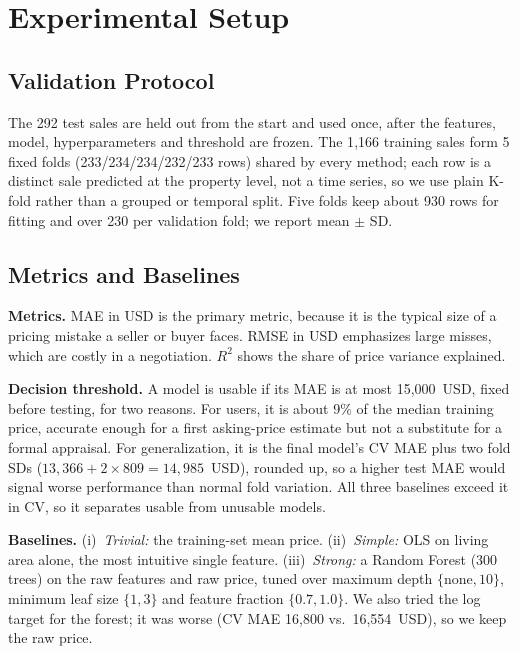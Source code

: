 \section{Experimental Setup}
\label{sec:setup}

\subsection{Validation Protocol}
The 292 test sales are held out from the start and used once, after the features, model, hyperparameters and threshold are frozen.
The 1{,}166 training sales form 5 fixed folds (233/234/234/232/233 rows) shared by every method; each row is a distinct sale predicted at the property level, not a time series, so we use plain K-fold rather than a grouped or temporal split.
Five folds keep about 930 rows for fitting and over 230 per validation fold; we report mean $\pm$ SD.

\subsection{Metrics and Baselines}
\textbf{Metrics.} MAE in USD is the primary metric, because it is the typical size of a pricing mistake a seller or buyer faces.
RMSE in USD emphasizes large misses, which are costly in a negotiation.
$R^2$ shows the share of price variance explained.

\textbf{Decision threshold.} A model is usable if its MAE is at most 15{,}000~USD, fixed before testing, for two reasons.
For users, it is about 9\% of the median training price, accurate enough for a first asking-price estimate but not a substitute for a formal appraisal.
For generalization, it is the final model's CV MAE plus two fold SDs ($13{,}366 + 2 \times 809 = 14{,}985$~USD), rounded up, so a higher test MAE would signal worse performance than normal fold variation.
All three baselines exceed it in CV, so it separates usable from unusable models.

\textbf{Baselines.} (i)~\emph{Trivial:} the training-set mean price.
(ii)~\emph{Simple:} OLS on living area alone, the most intuitive single feature.
(iii)~\emph{Strong:} a Random Forest (300 trees) on the raw features and raw price, tuned over maximum depth $\{\text{none}, 10\}$, minimum leaf size $\{1, 3\}$ and feature fraction $\{0.7, 1.0\}$.
We also tried the log target for the forest; it was worse (CV MAE 16{,}800 vs.\ 16{,}554~USD), so we keep the raw price.
